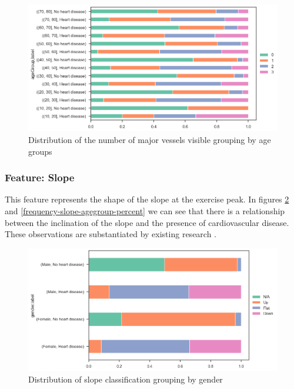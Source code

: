 \begin{figure}
    \caption{Distribution of the number of major vessels visible grouping by age groups}\label{frequency-vessel-age-percent}
    \centering
    \includegraphics[width=\linewidth]{media/frequency-02-agegroup-vessels.png}
\end{figure}

\subsubsection{Feature: Slope}

This feature represents the shape of the slope at the exercise peak. In figures \ref{frequency-slope-gender-percent}
and \ref{frequency-slope-agegroup-percent} we can see that there is a relationship between the inclination of the slope
and the presence of cardiovascular disease. These observations are substantiated by existing research \cite{Fluoroscopy}.

\begin{figure}
    \caption{Distribution of slope classification grouping by gender}\label{frequency-slope-gender-percent}
    \centering
    \includegraphics[width=\linewidth]{media/frequency-03-gender-slope.png}
\end{figure}

